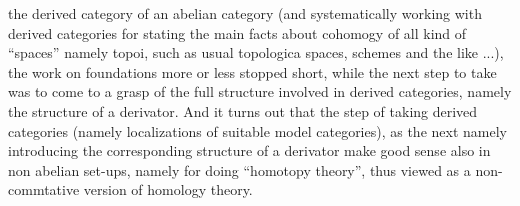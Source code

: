 the derived category of an abelian category (and systematically working
with  derived categories for stating the main  facts about
cohomogy of all kind of ``spaces'' namely topoi,  such as usual topologica
spaces,  schemes and the like ...),  the  work on foundations
more or less stopped short,  while the next step to take was to come to
a grasp of the full structure involved in derived categories,  namely the
structure of a derivator.  And it turns out that  the step of taking
derived categories (namely localizations of suitable model categories),
as the next namely introducing the corresponding structure of a derivator\hand{,}
make good sense also in non abelian set-ups,  namely for doing 
``homotopy theory'',  thus viewed as a non-commtative  version of homology
theory.

